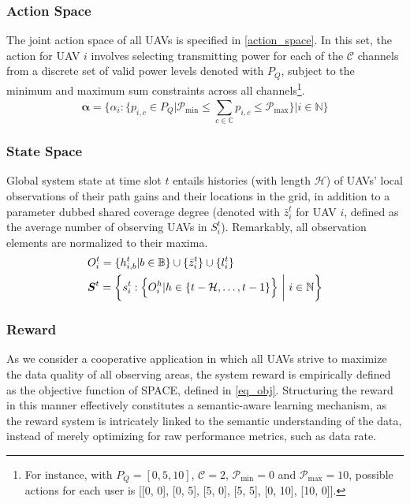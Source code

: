 \documentclass[conference]{IEEEtran}
\begin{document}
\subsubsection{Action Space}\label{ss_action_space}
The joint action space of all UAVs is specified in \eqref{action_space}. In this set, the action for UAV $i$ involves selecting transmitting power for each of the $\mathcal{C}$ channels from a discrete set of valid power levels denoted with $P_{Q}$, subject to the minimum and maximum sum constraints across all channels\footnote{For instance, with $P_{Q} = [0, 5, 10]$, $\mathcal{C} = 2$, $\mathcal{P}_{\text{min}} = 0$ and $\mathcal{P}_{\text{max}} = 10$, possible actions for each user is [[0, 0], [0, 5], [5, 0], [5, 5], [0, 10], [10, 0]].}.
\begin{equation}\label{action_space}
\boldsymbol{\alpha} = \bigg\{ \alpha_{i}: \big\{ p_{i, c} \in P_{Q} | \mathcal{P}_{\text{min}} \leq \sum_{c \in \mathbb{C}}^{}{p_{i, c}} \leq \mathcal{P}_{\text{max}}  \big\} \bigg| i \in \mathbb{N} \bigg\}
\end{equation}

\subsubsection{State Space}\label{ss_state_space}
Global system state at time slot $t$ entails histories (with length $\mathcal{H}$) of UAVs' local observations of their path gains and their locations in the grid, in addition to a parameter dubbed shared coverage degree (denoted with $\bar{z}_{i}^{t}$ for UAV $i$, defined as the average number of observing UAVs in $S_{i}^{t}$). Remarkably, all observation elements are normalized to their maxima.
\begin{align}\label{state_space}
& O_{i}^{t} = \{ h_{i, {b}}^{t} | b \in \mathbb{B} \} \cup \{ \bar{z}_{i}^{t} \} \cup \{ l_{i}^{t} \} \notag \\
& \boldsymbol{S}^{t} = { \bigg\{ {s}_{i}^{t} : \Big\{ O_{i}^{h} | h \in \{ t-\mathcal{H}, \ldots, t-1 \} \Big\} \ \bigg| \ i \in \mathbb{N} \bigg\} }
\end{align}

\subsubsection{Reward}\label{ss_reward}
As we consider a cooperative application in which all UAVs strive to maximize the data quality of all observing areas, the system reward is empirically defined as the objective function of SPACE, defined in \eqref{eq_obj}. Structuring the reward in this manner effectively constitutes a semantic-aware learning mechanism, as the reward system is intricately linked to the semantic understanding of the data, instead of merely optimizing for raw performance metrics, such as data rate.  
\end{document}
